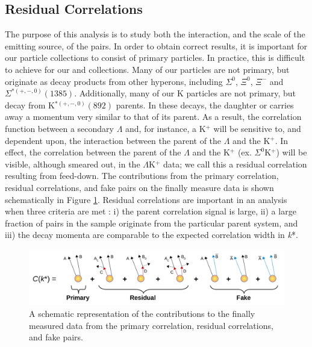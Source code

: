 \documentclass[../AnalysisNoteJBuxton.tex]{subfiles}
\begin{document}
\subsection{Residual Correlations}
\label{ResidualCorrelations}

The purpose of this analysis is to study both the interaction, and the scale of the emitting source, of the pairs.
In order to obtain correct results, it is important for our particle collections to consist of primary particles.
In practice, this is difficult to achieve for our \Lam and \ALam collections.
Many of our \Lam particles are not primary, but originate as decay products from other hyperons, including $\Sigma^{0}$, $\Xi^{0}$, $\Xi^{-}$ and $\Sigma^{*(+,-,0)}(1385)$.  Additionally, many of our K particles are not primary, but decay from K$^{*(+,-,0)}(892)$ parents.
In these decays, the daughter \Lam or \Ks carries away a momentum very similar to that of its parent.
As a result, the correlation function between a secondary $\Lambda$ and, for instance, a K$^{+}$  will be sensitive to, and dependent upon, the interaction between the parent of the $\Lambda$ and the K$^{+}$.
In effect, the correlation between the parent of the $\Lambda$ and the K$^{+}$ (ex. $\Sigma^{0}$K$^{+}$) will be visible, although smeared out, in the $\Lambda$K$^{+}$ data; we call this a residual correlation resulting from feed-down.
The contributions from the primary correlation, residual correlations, and fake pairs on the finally measure data is shown schematically in Figure \ref{fig:ResidualsCartoon}.
Residual correlations are important in an analysis when three criteria are met \cite{Kisiel:2014mma}: i) the parent correlation signal is large, ii) a large fraction of pairs in the sample originate from the particular parent system, and iii) the decay momenta are comparable to the expected correlation width in \textit{k}*. 


\begin{figure}[h]
  \centering
  \includegraphics[width=\textwidth]{5_Fitting/Figures/ResidualCartoons_p3.pdf}
  \caption[Residual Contributions Cartoon]{A schematic representation of the contributions to the finally measured data from the primary correlation, residual correlations, and fake pairs.}
  \label{fig:ResidualsCartoon}
\end{figure}
\end{document}
